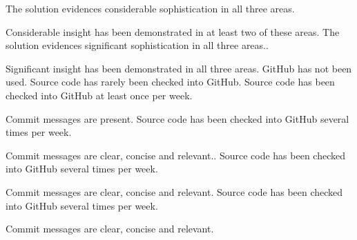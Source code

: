 \documentclass{../fal_assignment}
\begin{document}
\begin{markingrubric}
		\grade The solution evidences considerable sophistication in all three areas.
		\par Considerable insight has been demonstrated in at least two of these areas.
		\grade The solution evidences significant sophistication in all three areas..
		\par Significant insight has been demonstrated in all three areas.
		\grade\fail GitHub has not been used.
		\grade Source code has rarely been checked into GitHub.
		\grade Source code  has been checked into GitHub at least once per week.
		\par Commit messages are present.
		\grade Source code  has been checked into GitHub several times per week.
		\par Commit messages are clear, concise and relevant..
		\grade Source code has been checked into GitHub several times per week.
		\par Commit messages are clear, concise and relevant.
		\grade Source code has been checked into GitHub several times per week.
		\par Commit messages are clear, concise and relevant.
	\end{markingrubric}
	
\end{document}
